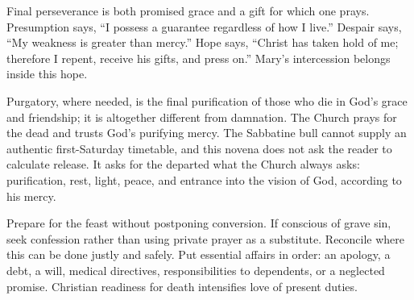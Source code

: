 Final perseverance is both promised grace and a gift for which one prays. Presumption says, ``I possess a guarantee regardless of how I live.'' Despair says, ``My weakness is greater than mercy.'' Hope says, ``Christ has taken hold of me; therefore I repent, receive his gifts, and press on.'' Mary's intercession belongs inside this hope.

Purgatory, where needed, is the final purification of those who die in God's grace and friendship; it is altogether different from damnation. The Church prays for the dead and trusts God's purifying mercy. The Sabbatine bull cannot supply an authentic first-Saturday timetable, and this novena does not ask the reader to calculate release. It asks for the departed what the Church always asks: purification, rest, light, peace, and entrance into the vision of God, according to his mercy.

Prepare for the feast without postponing conversion. If conscious of grave sin, seek confession rather than using private prayer as a substitute. Reconcile where this can be done justly and safely. Put essential affairs in order: an apology, a debt, a will, medical directives, responsibilities to dependents, or a neglected promise. Christian readiness for death intensifies love of present duties.




